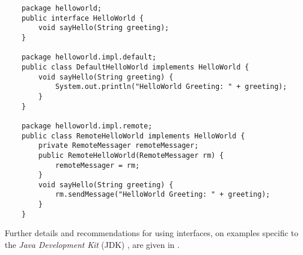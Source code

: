 \begin{scriptsize}
    \begin{verbatim}
    package helloworld;
    public interface HelloWorld {
        void sayHello(String greeting);
    }

    package helloworld.impl.default;
    public class DefaultHelloWorld implements HelloWorld {
        void sayHello(String greeting) {
            System.out.println("HelloWorld Greeting: " + greeting);
        }
    }

    package helloworld.impl.remote;
    public class RemoteHelloWorld implements HelloWorld {
        private RemoteMessager remoteMessager;
        public RemoteHelloWorld(RemoteMessager rm) {
            remoteMessager = rm;
        }
        void sayHello(String greeting) {
            rm.sendMessage("HelloWorld Greeting: " + greeting);
        }
    }
    \end{verbatim}
\end{scriptsize}

Further details and recommendations for using interfaces, on examples specific
to the \emph{Java Development Kit} (JDK) \cite{java}, are given in \cite{avalon}.
